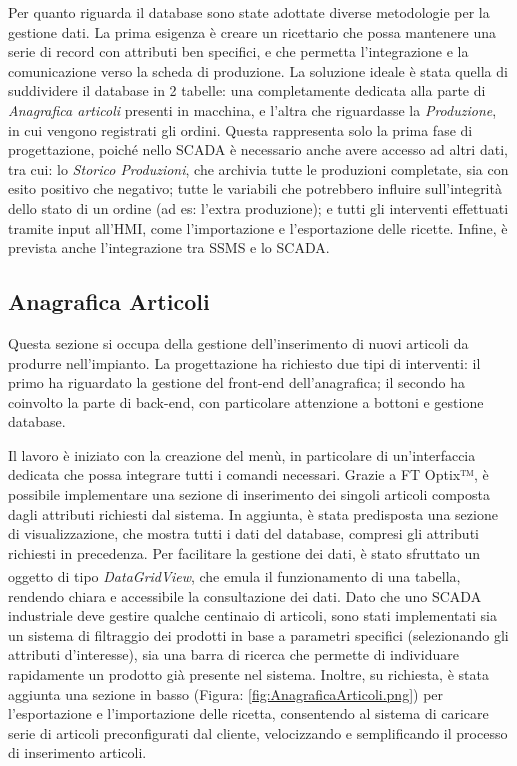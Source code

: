Per quanto riguarda il database sono state adottate diverse metodologie per la gestione dati. La prima esigenza è creare un ricettario che possa mantenere una serie di record con attributi ben specifici, e che permetta l'integrazione e la comunicazione verso la scheda di produzione. La soluzione ideale è stata quella di suddividere il database in 2 tabelle: una completamente dedicata alla parte di \textit{Anagrafica articoli} presenti in macchina, e l'altra che riguardasse la \textit{Produzione}, in cui vengono registrati gli ordini. Questa rappresenta solo la prima fase di progettazione, poiché nello SCADA è necessario anche avere accesso ad altri dati, tra cui: lo \textit{Storico Produzioni}, che archivia tutte le produzioni completate, sia con esito positivo che negativo; tutte le variabili che potrebbero influire sull'integrità dello stato di un ordine (ad es: l'extra produzione); e tutti gli interventi effettuati tramite input all'HMI, come l'importazione e l'esportazione delle ricette. Infine, è prevista anche l'integrazione tra SSMS e lo SCADA.

\subsection{Anagrafica Articoli} 
Questa sezione si occupa della gestione dell'inserimento di nuovi articoli da produrre nell'impianto. La progettazione ha richiesto due tipi di interventi: il primo ha riguardato la gestione del front-end dell'anagrafica; il secondo ha coinvolto la parte di back-end, con particolare attenzione a bottoni e gestione database. 

Il lavoro è iniziato con la creazione del menù, in particolare di un'interfaccia dedicata che possa integrare tutti i comandi necessari. Grazie a FT Optix™, è possibile implementare una sezione di inserimento dei singoli articoli composta dagli attributi richiesti dal sistema. In aggiunta, è stata predisposta una sezione di visualizzazione, che mostra tutti i dati del database, compresi gli attributi richiesti in precedenza. Per facilitare la gestione dei dati, è stato sfruttato un oggetto di tipo \textit{DataGridView}\textsuperscript{\cite{factorytalk_datagrid_example}}, che emula il funzionamento di una tabella, rendendo chiara e accessibile la consultazione dei dati. Dato che uno SCADA industriale deve gestire qualche centinaio di articoli, sono stati implementati sia un sistema di filtraggio dei prodotti in base a parametri specifici (selezionando gli attributi d'interesse), sia una barra di ricerca che permette di individuare rapidamente un prodotto già presente nel sistema. Inoltre, su richiesta, è stata aggiunta una sezione in basso (Figura: \ref{fig:AnagraficaArticoli.png}) per l'esportazione e l'importazione delle ricetta, consentendo al sistema di caricare serie di articoli preconfigurati dal cliente, velocizzando e semplificando il processo di inserimento articoli.

